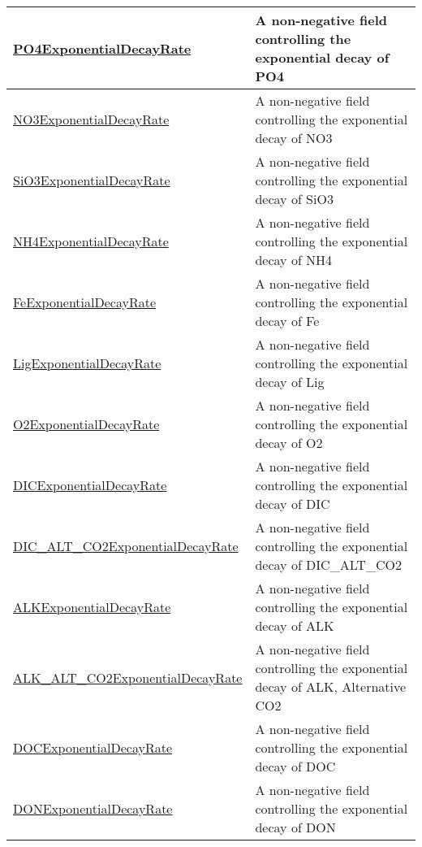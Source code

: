 {\begin{center}
\begin{longtable}{| p{2.0in} | p{4.0in} |}
    \hline
    \hyperref[subsec:var_sec_forcing_PO4ExponentialDecayRate]{PO4ExponentialDecayRate} & A non-negative field controlling the exponential decay of PO4 \\
    \hline
    \hyperref[subsec:var_sec_forcing_NO3ExponentialDecayRate]{NO3ExponentialDecayRate} & A non-negative field controlling the exponential decay of NO3 \\
    \hline
    \hyperref[subsec:var_sec_forcing_SiO3ExponentialDecayRate]{SiO3ExponentialDecayRate} & A non-negative field controlling the exponential decay of SiO3 \\
    \hline
    \hyperref[subsec:var_sec_forcing_NH4ExponentialDecayRate]{NH4ExponentialDecayRate} & A non-negative field controlling the exponential decay of NH4 \\
    \hline
    \hyperref[subsec:var_sec_forcing_FeExponentialDecayRate]{FeExponentialDecayRate} & A non-negative field controlling the exponential decay of Fe \\
    \hline
    \hyperref[subsec:var_sec_forcing_LigExponentialDecayRate]{LigExponentialDecayRate} & A non-negative field controlling the exponential decay of Lig \\
    \hline
    \hyperref[subsec:var_sec_forcing_O2ExponentialDecayRate]{O2ExponentialDecayRate} & A non-negative field controlling the exponential decay of O2 \\
    \hline
    \hyperref[subsec:var_sec_forcing_DICExponentialDecayRate]{DICExponentialDecayRate} & A non-negative field controlling the exponential decay of DIC \\
    \hline
    \hyperref[subsec:var_sec_forcing_DIC_ALT_CO2ExponentialDecayRate]{DIC\_ALT\_CO2Exponential\-DecayRate} & A non-negative field controlling the exponential decay of DIC\_ALT\_CO2 \\
    \hline
    \hyperref[subsec:var_sec_forcing_ALKExponentialDecayRate]{ALKExponentialDecayRate} & A non-negative field controlling the exponential decay of ALK \\
    \hline
    \hyperref[subsec:var_sec_forcing_ALK_ALT_CO2ExponentialDecayRate]{ALK\_ALT\_CO2Exponential\-DecayRate} & A non-negative field controlling the exponential decay of ALK, Alternative CO2 \\
    \hline
    \hyperref[subsec:var_sec_forcing_DOCExponentialDecayRate]{DOCExponentialDecayRate} & A non-negative field controlling the exponential decay of DOC \\
    \hline
    \hyperref[subsec:var_sec_forcing_DONExponentialDecayRate]{DONExponentialDecayRate} & A non-negative field controlling the exponential decay of DON \\

\end{longtable}
\end{center}}

